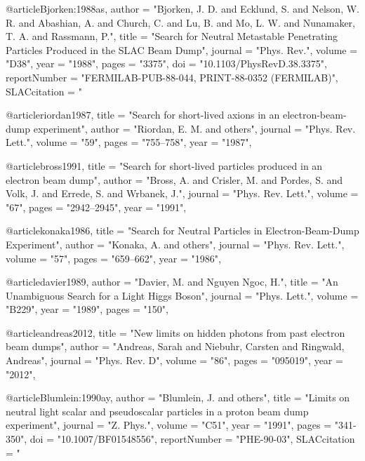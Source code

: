{{{{{{{{{{{{{{{{{@article{Bjorken:1988as,
      author         = "Bjorken, J. D. and Ecklund, S. and Nelson, W. R. and
                        Abashian, A. and Church, C. and Lu, B. and Mo, L. W. and
                        Nunamaker, T. A. and Rassmann, P.",
      title          = "{Search for Neutral Metastable Penetrating Particles
                        Produced in the SLAC Beam Dump}",
      journal        = "Phys. Rev.",
      volume         = "D38",
      year           = "1988",
      pages          = "3375",
      doi            = "10.1103/PhysRevD.38.3375",
      reportNumber   = "FERMILAB-PUB-88-044, PRINT-88-0352 (FERMILAB)",
      SLACcitation   = "%
}

@article{riordan1987,
    title   = "Search for short-lived axions in an electron-beam-dump experiment",
    author  = "Riordan, E. M. and others",
    journal = "Phys. Rev. Lett.",
    volume  = "59",
    pages   = "755--758",
    year    = "1987",
}

@article{bross1991,
    title   = "Search for short-lived particles produced in an electron beam dump",
    author  = "Bross, A. and Crisler, M. and Pordes, S. and Volk, J. and 
               Errede, S. and Wrbanek, J.",
    journal = "Phys. Rev. Lett.",
    volume  = "67",
    pages   = "2942--2945",
    year    = "1991",
}

@article{konaka1986,
    title   = "Search for Neutral Particles in Electron-Beam-Dump Experiment",
    author  = "Konaka, A. and others",
    journal = "Phys. Rev. Lett.",
    volume  = "57",
    pages   = "659--662",
    year    = "1986",
}

@article{davier1989,
    author  = "Davier, M. and Nguyen Ngoc, H.",
    title   = "{An Unambiguous Search for a Light Higgs Boson}",
    journal = "Phys. Lett.",
    volume  = "B229",
    year    = "1989",
    pages   = "150",
}

@article{andreas2012,
    title   = "New limits on hidden photons from past electron beam dumps",
    author  = "Andreas, Sarah and Niebuhr, Carsten and Ringwald, Andreas",
    journal = "Phys. Rev. D",
    volume  = "86",
    pages   = "095019",
    year    = "2012",
}

@article{Blumlein:1990ay,
      author         = "Blumlein, J. and others",
      title          = "{Limits on neutral light scalar and pseudoscalar
                        particles in a proton beam dump experiment}",
      journal        = "Z. Phys.",
      volume         = "C51",
      year           = "1991",
      pages          = "341-350",
      doi            = "10.1007/BF01548556",
      reportNumber   = "PHE-90-03",
      SLACcitation   = "%
}

}}}}}}}}}}}}}}}}}
